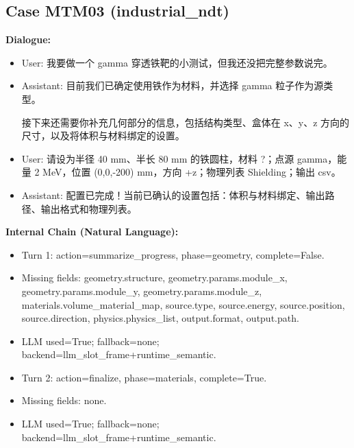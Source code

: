 \documentclass[11pt]{ctexart}
\begin{document}
\subsection{Case MTM03 (industrial\_ndt)}
\textbf{Dialogue:}
\begin{itemize}
\item User: 我要做一个 gamma 穿透铁靶的小测试，但我还没把完整参数说完。
\item Assistant: 目前我们已确定使用铁作为材料，并选择 gamma 粒子作为源类型。

接下来还需要你补充几何部分的信息，包括结构类型、盒体在 x、y、z 方向的尺寸，以及将体积与材料绑定的设置。
\item User: 请设为半径 40 mm、半长 80 mm 的铁圆柱，材料 ?；点源 gamma，能量 2 MeV，位置 (0,0,-200) mm，方向 +z；物理列表 Shielding；输出 csv。
\item Assistant: 配置已完成！当前已确认的设置包括：体积与材料绑定、输出路径、输出格式和物理列表。
\end{itemize}
\textbf{Internal Chain (Natural Language):}
\begin{itemize}
\item Turn 1: action=summarize\_progress, phase=geometry, complete=False.
\item Missing fields: geometry.structure, geometry.params.module\_x, geometry.params.module\_y, geometry.params.module\_z, materials.volume\_material\_map, source.type, source.energy, source.position, source.direction, physics.physics\_list, output.format, output.path.
\item LLM used=True; fallback=none; backend=llm\_slot\_frame+runtime\_semantic.
\item Turn 2: action=finalize, phase=materials, complete=True.
\item Missing fields: none.
\item LLM used=True; fallback=none; backend=llm\_slot\_frame+runtime\_semantic.
\end{itemize}
\end{document}

